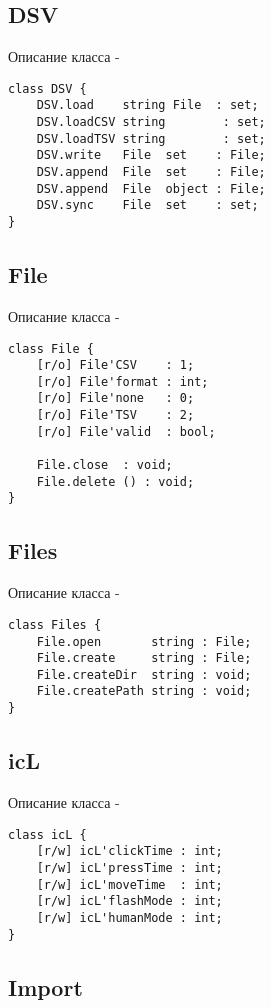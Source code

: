 \subsection{{\color{orange} DSV}}

\noindent Описание класса  -
\begin{lstlisting}[numbers=none]
class DSV {
    DSV.load    string File  : set;
	DSV.loadCSV string        : set;
	DSV.loadTSV string        : set;
	DSV.write   File  set    : File;
	DSV.append  File  set    : File;
	DSV.append  File  object : File;
	DSV.sync    File  set    : set;
}
\end{lstlisting}

\subsection{{\color{orange} File}}

\noindent Описание класса  -
\begin{lstlisting}[numbers=none]
class File {
    [r/o] File'CSV    : 1;
	[r/o] File'format : int;
	[r/o] File'none   : 0;
	[r/o] File'TSV    : 2;
	[r/o] File'valid  : bool;
	
    File.close  : void;
	File.delete () : void;
}
\end{lstlisting}

\subsection{{\color{orange} Files}}

\noindent Описание класса  -
\begin{lstlisting}[numbers=none]
class Files {
    File.open       string : File;
	File.create     string : File;
	File.createDir  string : void;
	File.createPath string : void;
}
\end{lstlisting}

\subsection{{\color{orange} icL}}

\noindent Описание класса  -
\begin{lstlisting}[numbers=none]
class icL {
    [r/w] icL'clickTime : int;
	[r/w] icL'pressTime : int;
	[r/w] icL'moveTime  : int;
	[r/w] icL'flashMode : int;
	[r/w] icL'humanMode : int;
}
\end{lstlisting}

\subsection{{\color{orange} Import}}

